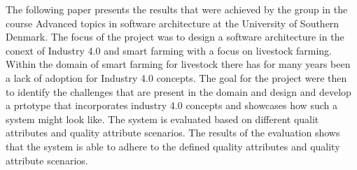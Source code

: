 The following paper presents the results that were achieved by the group in the course Advanced topics in software architecture at the University of Southern Denmark. The focus of the project was to design a software architecture in the conext of Industry 4.0 and smart farming with a focus on livestock farming. Within the domain of smart farming for livestock there has for many years been a lack of adoption for Industry 4.0 concepts. The goal for the project were then to identify the challenges that are present in the domain and design and develop a prtotype that incorporates industry 4.0 concepts and showcases how such a system might look like. The system is evaluated based on different qualit attributes and quality attribute scenarios. The results of the evaluation shows that the system is able to adhere to the defined quality attributes and quality attribute scenarios.